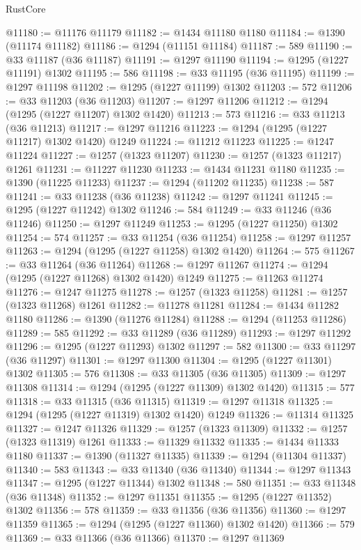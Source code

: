 \begin{lexlean}{RustCore}
\begin{coremodule}
@11180 := @11176 @11179
@11182 := @1434 @11180 @1180
@11184 := @1390 (@11174 @11182)
@11186 := @1294 (@11151 @11184)
@11187 := 589
@11190 := @33 @11187 (@36 @11187)
@11191 := @1297 @11190
@11194 := @1295 (@1227 @11191) @1302
@11195 := 586
@11198 := @33 @11195 (@36 @11195)
@11199 := @1297 @11198
@11202 := @1295 (@1227 @11199) @1302
@11203 := 572
@11206 := @33 @11203 (@36 @11203)
@11207 := @1297 @11206
@11212 := @1294 (@1295 (@1227 @11207) @1302 @1420)
@11213 := 573
@11216 := @33 @11213 (@36 @11213)
@11217 := @1297 @11216
@11223 := @1294 (@1295 (@1227 @11217) @1302 @1420) @1249
@11224 := @11212 @11223
@11225 := @1247 @11224
@11227 := @1257 (@1323 @11207)
@11230 := @1257 (@1323 @11217) @1261
@11231 := @11227 @11230
@11233 := @1434 @11231 @1180
@11235 := @1390 (@11225 @11233)
@11237 := @1294 (@11202 @11235)
@11238 := 587
@11241 := @33 @11238 (@36 @11238)
@11242 := @1297 @11241
@11245 := @1295 (@1227 @11242) @1302
@11246 := 584
@11249 := @33 @11246 (@36 @11246)
@11250 := @1297 @11249
@11253 := @1295 (@1227 @11250) @1302
@11254 := 574
@11257 := @33 @11254 (@36 @11254)
@11258 := @1297 @11257
@11263 := @1294 (@1295 (@1227 @11258) @1302 @1420)
@11264 := 575
@11267 := @33 @11264 (@36 @11264)
@11268 := @1297 @11267
@11274 := @1294 (@1295 (@1227 @11268) @1302 @1420) @1249
@11275 := @11263 @11274
@11276 := @1247 @11275
@11278 := @1257 (@1323 @11258)
@11281 := @1257 (@1323 @11268) @1261
@11282 := @11278 @11281
@11284 := @1434 @11282 @1180
@11286 := @1390 (@11276 @11284)
@11288 := @1294 (@11253 @11286)
@11289 := 585
@11292 := @33 @11289 (@36 @11289)
@11293 := @1297 @11292
@11296 := @1295 (@1227 @11293) @1302
@11297 := 582
@11300 := @33 @11297 (@36 @11297)
@11301 := @1297 @11300
@11304 := @1295 (@1227 @11301) @1302
@11305 := 576
@11308 := @33 @11305 (@36 @11305)
@11309 := @1297 @11308
@11314 := @1294 (@1295 (@1227 @11309) @1302 @1420)
@11315 := 577
@11318 := @33 @11315 (@36 @11315)
@11319 := @1297 @11318
@11325 := @1294 (@1295 (@1227 @11319) @1302 @1420) @1249
@11326 := @11314 @11325
@11327 := @1247 @11326
@11329 := @1257 (@1323 @11309)
@11332 := @1257 (@1323 @11319) @1261
@11333 := @11329 @11332
@11335 := @1434 @11333 @1180
@11337 := @1390 (@11327 @11335)
@11339 := @1294 (@11304 @11337)
@11340 := 583
@11343 := @33 @11340 (@36 @11340)
@11344 := @1297 @11343
@11347 := @1295 (@1227 @11344) @1302
@11348 := 580
@11351 := @33 @11348 (@36 @11348)
@11352 := @1297 @11351
@11355 := @1295 (@1227 @11352) @1302
@11356 := 578
@11359 := @33 @11356 (@36 @11356)
@11360 := @1297 @11359
@11365 := @1294 (@1295 (@1227 @11360) @1302 @1420)
@11366 := 579
@11369 := @33 @11366 (@36 @11366)
@11370 := @1297 @11369

\end{coremodule}
\end{lexlean}
